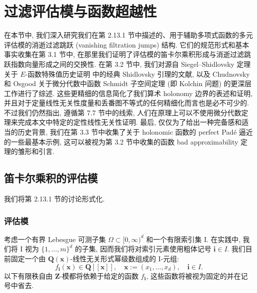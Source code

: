 \section{过滤评估模与函数超越性}\label{sec:3}

在本节中, 我们深入研究我们在第 2.13.1 节中描述的、用于辅助多项式函数的多元评估模的消逝过滤跳跃 (vanishing filtration jumps) 结构. 它们的规范形式和基本事实收集在第 3.1 节中, 在那里我们证明了评估模的笛卡尔乘积形成与消逝过滤跳跃指数向量形成之间的交换性. 在第 3.2 节中, 我们对源自 Siegel--Shidlovsky 定理关于 $E$-函数特殊值历史证明 \cite{Shi59} 中的经典 Shidlovsky 引理的文献, 以及 Chudnovsky 和 Osgood 关于微分代数中函数 Schmidt 子空间定理 (即 Kolchin 问题) 的更深层工作进行了综述. 这些更精细的信息简化了我们算术 holonomy 边界的表述和证明, 并且对于定量线性无关性度量和丢番图不等式的任何精细化而言也是必不可少的. 不过我们仍然指出, 遵循第 7.7 节中的线索, 人们在原理上可以不使用微分代数定理来完成本文中特定的定性线性无关性证明. 最后, 仅仅为了给出一种完备感和适当的历史背景, 我们在第 3.3 节中收集了关于 holonomic 函数的 perfect Pad{\'e} 逼近的一些最基本示例, 这可以被视为第 3.2 节中收集的函数 bad approximability 定理的雏形和引言.

\subsection{笛卡尔乘积的评估模}\label{sec:3.1}

我们将第 2.13.1 节的讨论形式化.

\subsubsection{评估模}\label{sec:3.1.1}

考虑一个有界 Lebesgue 可测子集 \(\Omega \subset [0,\infty)^d\) 和一个有限索引集 I. 在实践中, 我们将 I 视为 \(\{1,\ldots,m\}^d\) 的子集, 因而我们将对索引元素使用粗体记号 \(\mathbf{i} \in I\). 我们目前固定一个由 \(\mathbf{Q}(\mathbf{x})\)-线性无关形式幂级数组成的 I-元组:
\[ f_{\mathbf{i}}(\mathbf{x}) \in \mathbf{Q}[\![\mathbf{x}]\!], \quad \mathbf{x} := (x_1, \dots, x_d), \quad \mathbf{i} \in I. \]
以下有限秩自由 \(\mathbf{Z}\)-模都将依赖于给定的函数 \(f_{\mathbf{i}}\), 这些函数将被视为固定的并在记号中省去.

